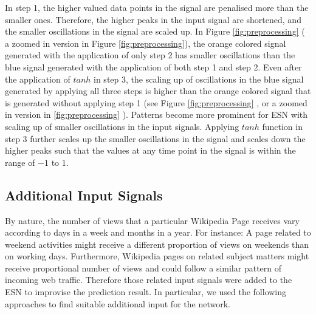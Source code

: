  In step 1, the higher valued data points in the signal are penalised more than the smaller ones. Therefore, the higher peaks in the input signal are shortened, and the smaller oscillations in the signal are scaled up. In  Figure  \ref{fig:preprocessing} ( a zoomed in version in Figure \ref{fig:preprocessing}), the orange colored signal generated with the application of only step 2 has smaller oscillations than the blue signal generated with the application of both step 1 and step 2. Even after the application of $tanh$ in step 3, the scaling up of oscillations in the blue signal generated by applying all three steps is higher than the orange colored signal that is generated without applying step 1 (see Figure \ref{fig:preprocessing} , or a zoomed in version in \ref{fig:preprocessing}  ). Patterns become more prominent for ESN with scaling up of smaller oscillations in the input signals.  Applying $tanh$ function in step 3 further scales up the smaller oscillations in the signal and scales down the higher peaks such that the values at any time point in the signal is within the range of $-1$ to $1$.
 \subsection{Additional Input Signals}

 
 \indent \indent
 By nature, the number of views that a particular Wikipedia Page receives vary according to  days in a week and months in a year. For instance: A page related to weekend activities might receive a different proportion of views on weekends than on working days. Furthermore, Wikipedia pages on related subject matters might receive proportional number of views and could follow a similar pattern of incoming web traffic. Therefore those related input signals were added to the ESN to improvise the prediction result. In particular, we used the following approaches to find suitable additional input for the network. \\\\
 
